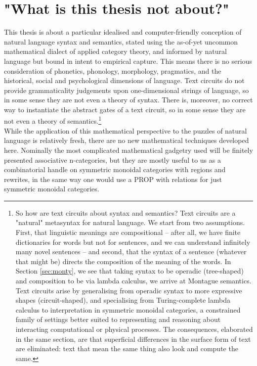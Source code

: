 \section{"What is this thesis not about?"}
This thesis is about a particular idealised and computer-friendly conception of natural language syntax and semantics, stated using the as-of-yet uncommon mathematical dialect of applied category theory, and informed by natural language but bound in intent to empirical capture. This means there is no serious consideration of phonetics, phonology, morphology, pragmatics, and the historical, social and psychological dimensions of language. Text circuits do not provide grammaticality judgements upon one-dimensional strings of language, so in some sense they are not even a theory of syntax. There is, moreover, no correct way to instantiate the abstract gates of a text circuit, so in some sense they are not even a theory of semantics.\footnote{
So how are text circuits about syntax and semantics? Text circuits are a "natural" metasyntax for natural language. We start from two assumptions. First, that linguistic meanings are compositional -- after all, we have finite dictionaries for words but not for sentences, and we can understand infinitely many novel sentences -- and second, that the syntax of a sentence (whatever that might be) directs the composition of the meaning of the words. In Section \ref{sec:monty}, we see that taking syntax to be operadic (tree-shaped) and composition to be via lambda calculus, we arrive at Montague semantics. Text circuits arise by generalising from operadic syntax to more expressive shapes (circuit-shaped), and specialising from Turing-complete lambda calculus to interpretation in symmetric monoidal categories, a constrained family of settings better suited to representing and reasoning about interacting computational or physical processes. The consequences, elaborated in the same section, are that superficial differences in the surface form of text are eliminated: text that mean the same thing also look and compute the same.
}\\

While the application of this mathematical perspective to the puzzles of natural language is relatively fresh, there are no new mathematical techniques developed here. Nominally the most complicated mathematical gadgetry used will be finitely presented associative n-categories, but they are mostly useful to us as a combinatorial handle on symmetric monoidal categories with regions and rewrites, in the same way one would use a PROP with relations for just symmetric monoidal categories.\\


